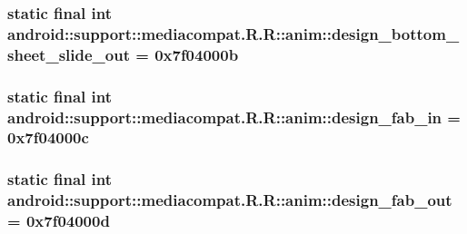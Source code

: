 \hypertarget{classandroid_1_1support_1_1mediacompat_1_1_r_1_1anim_9b3b14021bc84af0747bee830da01526}{
\subsubsection[{design\_\-bottom\_\-sheet\_\-slide\_\-out}]{\setlength{\rightskip}{0pt plus 5cm}static final int android::support::mediacompat.R.R::anim::design\_\-bottom\_\-sheet\_\-slide\_\-out = 0x7f04000b}}
\label{classandroid_1_1support_1_1mediacompat_1_1_r_1_1anim_9b3b14021bc84af0747bee830da01526}


\hypertarget{classandroid_1_1support_1_1mediacompat_1_1_r_1_1anim_30811b16e6e81cb38f3ec18e8da9d05c}{
\subsubsection[{design\_\-fab\_\-in}]{\setlength{\rightskip}{0pt plus 5cm}static final int android::support::mediacompat.R.R::anim::design\_\-fab\_\-in = 0x7f04000c}}
\label{classandroid_1_1support_1_1mediacompat_1_1_r_1_1anim_30811b16e6e81cb38f3ec18e8da9d05c}


\hypertarget{classandroid_1_1support_1_1mediacompat_1_1_r_1_1anim_c1688b40ed0b577918cc20d46f21cbdd}{
\subsubsection[{design\_\-fab\_\-out}]{\setlength{\rightskip}{0pt plus 5cm}static final int android::support::mediacompat.R.R::anim::design\_\-fab\_\-out = 0x7f04000d}}
\label{classandroid_1_1support_1_1mediacompat_1_1_r_1_1anim_c1688b40ed0b577918cc20d46f21cbdd}


